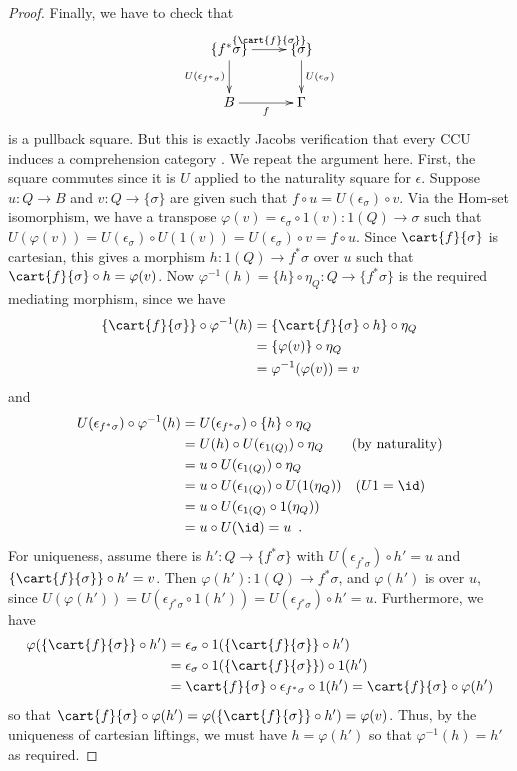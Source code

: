 \documentclass{article}
\begin{document}
\begin{proof}
  Finally, we have to check that
  \[
  \xymatrix{
    \{f^* \sigma\} \ar^-{\{\cart{f}{\sigma}\}}[r] \ar_-{U(\epsilon_{f^* \sigma})}[d] & \{ \sigma\} \ar^-{U(\epsilon_{\sigma})}[d] \\
    B \ar_-{f}[r] & \Gamma
  }
  \]
  is a pullback square. But this is exactly Jacobs verification that
  every CCU induces a comprehension category \cite[p.\
  616]{jacobs1999catlogTT}. We repeat the argument here. First, the
  square commutes since it is $U$ applied to the naturality square for
  $\epsilon$. Suppose $u : Q \to B$ and $v : Q \to \{ \sigma\}$ are
  given such that $f \circ u = U(\epsilon_{\sigma}) \circ v$. Via the
  Hom-set isomorphism, we have a transpose $\varphi(v) =
  \epsilon_{\sigma} \circ 1(v) : 1(Q) \to \sigma$ such that
  $U(\varphi(v)) = U(\epsilon_{\sigma}) \circ U(1(v)) =
  U(\epsilon_{\sigma}) \circ v = f \circ u$. Since $\cart{f}{\sigma}$
  is cartesian, this gives a morphism $h : 1(Q) \to f^* \sigma$ over
  $u$ such that $\cart{f}{\sigma} \circ h = \varphi(v)$. Now
  $\varphi^{-1}(h) = \{h\} \circ \eta_{Q} : Q \to \{f^* \sigma\}$ is
  the required mediating morphism, since we have
  \begin{align*}
    \{\cart{f}{\sigma}\} \circ \varphi^{-1}(h)
 &= \{\cart{f}{\sigma} \circ h \} \circ \eta_Q \\ 
 &= \{\varphi(v) \} \circ \eta_Q \\
 &= \varphi^{-1}(\varphi(v)) = v
  \end{align*}
  and
  \begin{align*}
    U(\epsilon_{f^* \sigma}) \circ \varphi^{-1}(h)
 &= U(\epsilon_{f^* \sigma}) \circ \{h\} \circ \eta_Q \\
 &= U(h) \circ U(\epsilon_{1(Q)}) \circ \eta_Q \qquad \text{(by naturality)}\\
 &= u \circ U(\epsilon_{1(Q)}) \circ \eta_Q\\
 &= u \circ U(\epsilon_{1(Q)}) \circ U(1(\eta_Q)) \quad \text{($U1 = \id$)}\\
 &= u \circ U(\epsilon_{1(Q)} \circ 1(\eta_Q))\\
 &= u \circ U(\id) = u \enspace .
  \end{align*}
  For uniqueness, assume there is $h' : Q \to \{f^* \sigma\}$ with
  $U(\epsilon_{f^* \sigma}) \circ h' = u$ and $\{\cart{f}{\sigma}\}
  \circ h' = v$. Then $\varphi(h') : 1(Q) \to f^* \sigma$, and
  $\varphi(h')$ is over $u$, since $U(\varphi(h')) = U(\epsilon_{f^*
    \sigma} \circ 1(h')) = U(\epsilon_{f^* \sigma}) \circ h' =
  u$. Furthermore, we have
  \begin{align*}
    \varphi(\{\cart{f}{\sigma}\} \circ h')
 &= \epsilon_{\sigma} \circ 1(\{\cart{f}{\sigma}\} \circ h') \\
 &= \epsilon_{\sigma} \circ 1(\{\cart{f}{\sigma}\}) \circ 1(h') \\
 &= \cart{f}{\sigma} \circ \epsilon_{f^* \sigma} \circ 1(h')
 = \cart{f}{\sigma} \circ \varphi(h')
  \end{align*}
  so that $\cart{f}{\sigma} \circ \varphi(h') =
  \varphi(\{\cart{f}{\sigma}\} \circ h') = \varphi(v)$. Thus, by the
  uniqueness of cartesian liftings, we must have $h = \varphi(h')$ so
  that $\varphi^{-1}(h) = h'$ as required.
\end{proof}





\end{document}
